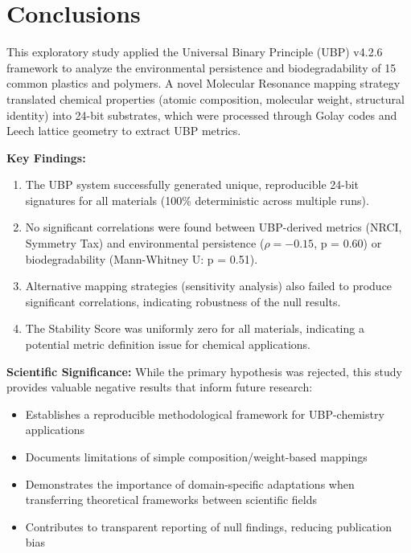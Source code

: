 \documentclass[11pt,letterpaper]{article}
\begin{document}
\section{Conclusions}

This exploratory study applied the Universal Binary Principle (UBP) v4.2.6 framework to analyze the environmental persistence and biodegradability of 15 common plastics and polymers. A novel Molecular Resonance mapping strategy translated chemical properties (atomic composition, molecular weight, structural identity) into 24-bit substrates, which were processed through Golay codes and Leech lattice geometry to extract UBP metrics.

\textbf{Key Findings:}
\begin{enumerate}
    \item The UBP system successfully generated unique, reproducible 24-bit signatures for all materials (100\% deterministic across multiple runs).
    \item No significant correlations were found between UBP-derived metrics (NRCI, Symmetry Tax) and environmental persistence ($\rho = -0.15$, p = 0.60) or biodegradability (Mann-Whitney U: p = 0.51).
    \item Alternative mapping strategies (sensitivity analysis) also failed to produce significant correlations, indicating robustness of the null results.
    \item The Stability Score was uniformly zero for all materials, indicating a potential metric definition issue for chemical applications.
\end{enumerate}

\textbf{Scientific Significance:}
While the primary hypothesis was rejected, this study provides valuable negative results that inform future research:
\begin{itemize}
    \item Establishes a reproducible methodological framework for UBP-chemistry applications
    \item Documents limitations of simple composition/weight-based mappings
    \item Demonstrates the importance of domain-specific adaptations when transferring theoretical frameworks between scientific fields
    \item Contributes to transparent reporting of null findings, reducing publication bias
\end{itemize}
\end{document}
